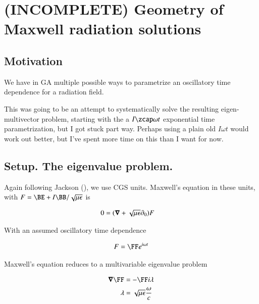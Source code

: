 %

\chapter{(INCOMPLETE) Geometry of Maxwell radiation solutions}
\label{chap:radiationGeometry}
{}
\date{Aug 14, 2009}

\beginArtWithToc

\section{Motivation}

We have in GA multiple possible ways to parametrize an oscillatory time dependence for a radiation field.  

This was going to be an attempt to systematically solve the resulting eigen-multivector problem, starting with the a $I\zcap \omega t$ exponential time parametrization, but I got stuck part way.  Perhaps using a plain old $I \omega t$ would work out better, but I've spent more time on this than I want for now.

\section{Setup.  The eigenvalue problem.}

Again following Jackson (\citep{jackson1975cew}), we use CGS units.  Maxwell's equation in these units, with $F = \BE + I\BB/\sqrt{\mu\epsilon}$ is

\begin{align}\label{eqn:radiationGeometry:foo1}
0 &= (\boldsymbol{\nabla} + \sqrt{\mu\epsilon} \partial_0) F 
\end{align}

With an assumed oscillatory time dependence 

\begin{align}\label{eqn:radiationGeometry:foo2}
F = 
\FF 
e^{i\omega t}
\end{align}

Maxwell's equation reduces to a multivariable eigenvalue problem

\begin{align}\label{eqn:radiationGeometry:foo3}
\spacegrad \FF &= - \FF i \lambda \\
\lambda &= \sqrt{\mu\epsilon} \frac{\omega}{c} 
\end{align}

